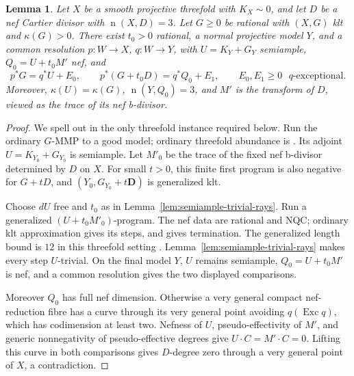 \documentclass[12pt,a4paper,psamsfonts]{amsart}
\theoremstyle{definition}
\theoremstyle{plain}
\newtheorem{lemma}{Lemma}[section]
\newcommand{\nef}{\operatorname{n}}
\begin{document}
\begin{lemma}\label{lem:positive-boundary-model}
Let $X$ be a smooth projective threefold with $K_X\sim0$,
and let $D$ be a nef Cartier divisor with $\nef(X,D)=3$.
Let $G\ge0$ be rational with $(X,G)$ klt and $\kappa(G)>0$.
There exist $t_0>0$ rational, a normal projective model $Y$, and
a common resolution $p:W\to X$, $q:W\to Y$, with
$U=K_Y+G_Y$ semiample, $Q_0=U+t_0M'$ nef, and
\begin{equation}\label{eq:positive-boundary-comparison}
 p^*G=q^*U+E_0,\qquad
 p^*(G+t_0D)=q^*Q_0+E_1,
 \qquad E_0,E_1\ge0\text{ $q$-exceptional}.
\end{equation}
Moreover, $\kappa(U)=\kappa(G)$, $\nef(Y,Q_0)=3$, and $M'$
is the transform of $D$, viewed as the trace of its nef b-divisor.
\end{lemma}
\begin{proof}
We spell out \cite[Proposition~3.3]{NS} in the only threefold
instance required below. Run the ordinary $G$-MMP to a good
model; ordinary threefold abundance is \cite{KollarEtAl}.
Its adjoint $U=K_{Y_0}+G_{Y_0}$ is semiample. Let $M'_0$ be the
trace of the fixed nef b-divisor determined by $D$ on $X$.
For small $t>0$, this finite first program is also negative for
$G+tD$, and $(Y_0,G_{Y_0}+t\mathbf D)$ is generalized klt.


Choose $dU$ free and $t_0$ as in
Lemma~\ref{lem:semiample-trivial-rays}. Run a generalized
$(U+t_0M'_0)$-program. The nef data are rational and NQC;
ordinary klt approximation gives its steps, and
\cite[Theorem~1.2]{ChenTsakanikas} gives termination.
The generalized length bound is $12$ in this threefold setting
\cite[Lemma~3.1]{NS}. Lemma~\ref{lem:semiample-trivial-rays}
makes every step $U$-trivial.
On the final model $Y$, $U$ remains
semiample, $Q_0=U+t_0M'$ is nef, and a common resolution gives the two displayed comparisons.

Moreover $Q_0$ has full nef dimension. Otherwise a very general
compact nef-reduction fibre has a curve through its very general
point avoiding $q(\operatorname{Exc}q)$, which has codimension
at least two. Nefness of $U$, pseudo-effectivity of $M'$, and
generic nonnegativity of pseudo-effective degrees give $U\cdot C=M'\cdot C=0$.
Lifting this curve in both comparisons gives $D$-degree zero
through a very general point of $X$, a contradiction.
\end{proof}
\end{document}
